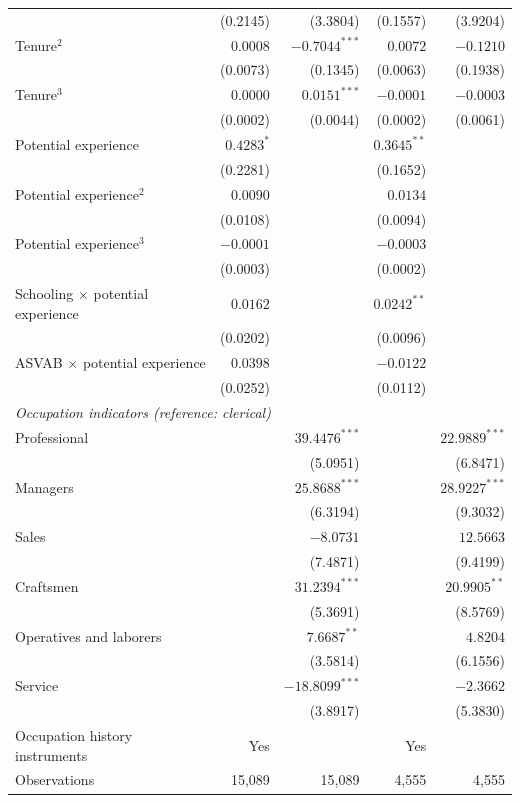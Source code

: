 \documentclass[11pt]{article}
\begin{document}
\begin{table}[p]
\begin{threeparttable}
\begin{tabular*}{\textwidth}{@{\extracolsep{\fill}}p{}rrrr@{}}
 & (0.2145) & (3.3804) & (0.1557) & (3.9204) \\
Tenure$^2$ & $0.0008$ & $-0.7044^{***}$ & $0.0072$ & $-0.1210$ \\
 & (0.0073) & (0.1345) & (0.0063) & (0.1938) \\
Tenure$^3$ & $0.0000$ & $0.0151^{***}$ & $-0.0001$ & $-0.0003$ \\
 & (0.0002) & (0.0044) & (0.0002) & (0.0061) \\
Potential experience & $0.4283^{*}$ &  & $0.3645^{**}$ &  \\
 & (0.2281) &  & (0.1652) &  \\
Potential experience$^2$ & $0.0090$ &  & $0.0134$ &  \\
 & (0.0108) &  & (0.0094) &  \\
Potential experience$^3$ & $-0.0001$ &  & $-0.0003$ &  \\
 & (0.0003) &  & (0.0002) &  \\
Schooling $\times$ potential experience & $0.0162$ &  & $0.0242^{**}$ &  \\
 & (0.0202) &  & (0.0096) &  \\
ASVAB $\times$ potential experience & $0.0398$ &  & $-0.0122$ &  \\
 & (0.0252) &  & (0.0112) &  \\
\multicolumn{5}{l}{\textit{Occupation indicators (reference: clerical)}} \\
Professional &  & $39.4476^{***}$ &  & $22.9889^{***}$ \\
 &  & (5.0951) &  & (6.8471) \\
Managers &  & $25.8688^{***}$ &  & $28.9227^{***}$ \\
 &  & (6.3194) &  & (9.3032) \\
Sales &  & $-8.0731$ &  & $12.5663$ \\
 &  & (7.4871) &  & (9.4199) \\
Craftsmen &  & $31.2394^{***}$ &  & $20.9905^{**}$ \\
 &  & (5.3691) &  & (8.5769) \\
Operatives and laborers &  & $7.6687^{**}$ &  & $4.8204$ \\
 &  & (3.5814) &  & (6.1556) \\
Service &  & $-18.8099^{***}$ &  & $-2.3662$ \\
 &  & (3.8917) &  & (5.3830) \\
\midrule
Occupation history instruments & Yes &  & Yes &  \\
Observations & 15,089 & 15,089 & 4,555 & 4,555 \\

\end{tabular*}
\end{threeparttable}
\end{table}
\end{document}
